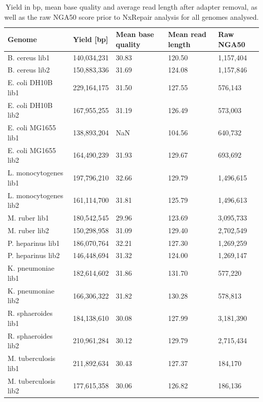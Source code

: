 \begin{table}[]
\begin{center}
{
\caption{Yield in bp, mean base quality and average read length after adapter removal, as well as the raw NGA50 score prior to NxRepair analysis for all genomes analysed.\label{tab:yield}}
{\begin{tabular}{lllll}\hline
Genome & Yield [bp] & Mean base quality & Mean read length & Raw NGA50 \\\hline
B. cereus lib1 & 140,034,231 & 30.83 & 120.50 &  1,157,404\\
B. cereus lib2 & 150,883,336 & 31.69 & 124.08  & 1,157,846\\
E. coli DH10B lib1 & 229,164,175 & 31.50 & 127.55 & 576,143\\
E. coli DH10B lib2 & 167,955,255 & 31.19 & 126.49 & 573,003\\
E. coli MG1655 lib1 & 138,893,204 & NaN & 104.56 & 640,732\\
E. coli MG1655 lib2 & 164,490,239 & 31.93 & 129.67 & 693,692\\
L. monocytogenes lib1 & 197,796,210 & 32.66 & 129.79 & 1,496,615\\
L. monocytogenes lib2 & 161,114,700 & 31.81 & 125.79 & 1,496,613\\
M. ruber lib1 & 180,542,545 & 29.96 & 123.69 & 3,095,733\\
M. ruber lib2 & 150,298,958 & 31.09 & 129.40 & 2,702,549\\
P. heparinus lib1 & 186,070,764 & 32.21 & 127.30 & 1,269,259\\
P. heparinus lib2 & 146,448,694 & 31.32 & 124.00 & 1,269,147\\
K. pneumoniae lib1 & 182,614,602 & 31.86 & 131.70 & 577,220\\
K. pneumoniae lib2 & 166,306,322 & 31.82 & 130.28 & 578,813\\
R. sphaeroides lib1 & 184,138,610 & 30.08 & 127.99 & 3,181,390\\
R. sphaeroides lib2 & 210,961,284 & 30.12 & 129.79 & 2,715,434\\
M. tuberculosis lib1 & 211,892,634 & 30.43 & 127.37 & 184,170\\
M. tuberculosis lib2 & 177,615,358 & 30.06 & 126.82 & 186,136\\\hline
\end{tabular}}{}
}
\end{center}
\end{table}  


